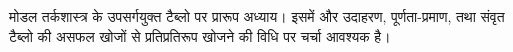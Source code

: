 \documentclass[../../../include/open-logic-chapter]{subfiles}
\begin{document}

\begin{editorial}
  मोडल तर्कशास्त्र के उपसर्गयुक्त टैब्लो पर प्रारूप अध्याय। इसमें और
  उदाहरण, पूर्णता-प्रमाण, तथा संवृत टैब्लो की असफल खोजों से प्रतिप्रतिरूप
  खोजने की विधि पर चर्चा आवश्यक है।
\end{editorial}


\OLEndChapterHook
\end{document}
